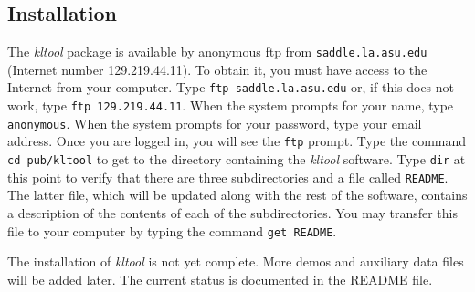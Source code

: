 \subsection{Installation}
\label{sec:installation}
The {\sl kltool} package is available by anonymous ftp from
{\tt saddle.la.asu.edu} (Internet number 129.219.44.11).
To obtain it, you must have access to the Internet from your
computer.  Type
	{\tt ftp saddle.la.asu.edu}
or, if this does not work, type
	{\tt ftp 129.219.44.11}.
When the system prompts for your name, type {\tt anonymous}.
When the system prompts for your password, type your 
email address.  Once you are logged in, you will see the {\tt ftp}
prompt.  Type the command
	{\tt cd pub/kltool}
to get to the directory containing the {\sl kltool} software.
Type
	{\tt dir}
at this point to verify that there are three subdirectories and a
file called {\tt README}.  The latter file, which will be updated
along with the rest of the software, contains a description of
the contents of each of the subdirectories.  You may transfer
this file to your computer by typing the command {\tt get README}.

The installation of {\sl kltool} is not yet complete.  More demos and auxiliary
data files will be added later.  The current status is documented in the
README file.

